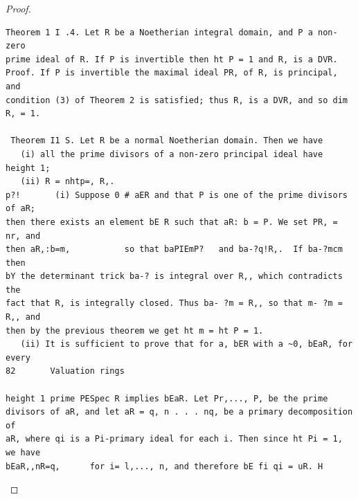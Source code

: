 \begin{proof}
\begin{verbatim}
Theorem 1 I .4. Let R be a Noetherian integral domain, and P a non-zero
prime ideal of R. If P is invertible then ht P = 1 and R, is a DVR.
Proof. If P is invertible the maximal ideal PR, of R, is principal, and
condition (3) of Theorem 2 is satisfied; thus R, is a DVR, and so dim R, = 1.

 Theorem I1 S. Let R be a normal Noetherian domain. Then we have
   (i) all the prime divisors of a non-zero principal ideal have height 1;
   (ii) R = nhtp=, R,.
p?!       (i) Suppose 0 # aER and that P is one of the prime divisors of aR;
then there exists an element bE R such that aR: b = P. We set PR, = nr, and
then aR,:b=m,           so that baPIEmP?   and ba-?q!R,.  If ba-?mcm    then
bY the determinant trick ba-? is integral over R,, which contradicts the
fact that R, is integrally closed. Thus ba- ?m = R,, so that m- ?m = R,, and
then by the previous theorem we get ht m = ht P = 1.
   (ii) It is sufficient to prove that for a, bER with a ~0, bEaR, for every
82       Valuation rings

height 1 prime PESpec R implies bEaR. Let Pr,..., P, be the prime
divisors of aR, and let aR = q, n . . . nq, be a primary decomposition of
aR, where qi is a Pi-primary ideal for each i. Then since ht Pi = 1, we have
bEaR,,nR=q,      for i= l,..., n, and therefore bE fi qi = uR. H
\end{verbatim}
\end{proof}


